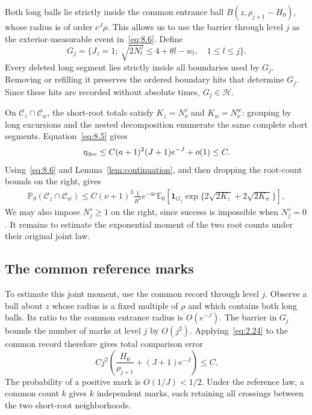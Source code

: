 \documentclass[11pt,letterpaper,reqno]{amsart}
\numberwithin{equation}{section}
\theoremstyle{remark}
\begin{document}
Both long balls lie strictly inside the common entrance ball $B(z,\rho_{j+1}-H_0)$, whose radius is of order $e^J\rho$. This allows us to use the barrier through level $j$ as the exterior-measurable event in~\eqref{eq:8.6}. Define
\begin{equation}\label{eq:8.9}
G_j=\{J_z=1;\ \sqrt{2N_l^z}\le4+\theta l-w_l,\quad1\le l\le j\}.
\end{equation}
Every deleted long segment lies strictly inside all boundaries used by $G_j$. Removing or refilling it preserves the ordered boundary hits that determine $G_j$. Since these hits are recorded without absolute times, $G_j\in\mathscr H$.

On $\mathcal C_z\cap\mathcal C_w$, the short-root totals satisfy
$K_z=N_\nu^z$ and $K_w=N_\nu^w$: grouping by long excursions and the nested decomposition enumerate the same complete short segments. Equation~\eqref{eq:8.5} gives
\begin{equation}\label{eq:8.10}
\eta_{\rm dec}\le C(a+1)^2(J+1)e^{-J}+o(1)\le C.
\end{equation}
Using~\eqref{eq:8.6} and Lemma~\ref{lem:continuation}, and then dropping the root-count bounds on the right, gives
\begin{equation}\label{eq:8.11}
\begin{split}
\mathbb P_0(\mathcal C_z\cap\mathcal C_w)
\le C(\nu+1)^3\frac{1}{R^4}e^{-4\nu}
\mathbb E_0[\mathbf1_{G_j}\exp\{2\sqrt{2K_z}+2\sqrt{2K_w}\}],
\end{split}
\end{equation}
We may also impose $N_j^z\ge1$ on the right, since success is impossible when $N_j^z=0$. It remains to estimate the exponential moment of the two root counts under their original joint law.

\subsection{The common reference marks}\label{sec:commonmarks}
To estimate this joint moment, use the common record through level $j$. Observe a ball about $z$ whose radius is a fixed multiple of $\rho$ and which contains both long balls. Its ratio to the common entrance radius is $O(e^{-J})$. The barrier in $G_j$ bounds the number of marks at level $j$ by $O(j^2)$. Applying~\eqref{eq:2.24} to the common record therefore gives total comparison error
\begin{equation}\label{eq:8.12}
Cj^2\left(\frac{H_0}{\rho_{j+1}}+(J+1)e^{-J}\right)\le C.
\end{equation}
The probability of a positive mark is $O(1/J)<1/2$. Under the reference law, a common count $k$ gives $k$ independent marks, each retaining all crossings between the two short-root neighborhoods.
\end{document}
